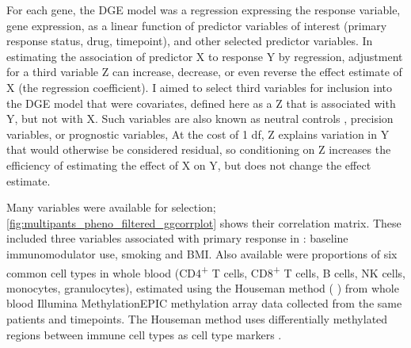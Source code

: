 For each gene, the \gls{DGE} model was a regression expressing the response variable, gene expression, 
as a linear function of predictor variables of interest (primary response status, drug, timepoint),
and other selected predictor variables.
In estimating the association of predictor X to response Y by regression, 
adjustment for a third variable Z can increase, decrease, or even reverse the effect estimate of X (the regression coefficient).
I aimed to select third variables for inclusion into the \gls{DGE} model that were covariates,
defined here as a Z that is associated with Y, but not with X.
Such variables are also known as neutral controls \autocite{cinelli2020CrashCourseGood}, precision variables, or prognostic variables,
At the cost of 1 \gls{df},
Z explains variation in Y that would otherwise be considered residual,
so conditioning on Z increases the efficiency of estimating the effect of X on Y, but does not change the effect estimate.

Many variables were available for selection;
\cref{fig:multipants_pheno_filtered_ggcorrplot} shows their correlation matrix.
These included three variables associated with primary response in \textcite{kennedy2019PredictorsAntiTNFTreatment}: baseline immunomodulator use, smoking and \gls{BMI}.
Also available were proportions of six common cell types in whole blood 
(CD4\textsuperscript{+} T cells, CD8\textsuperscript{+} T cells, B cells, \gls{NK} cells, monocytes, granulocytes),
estimated using the Houseman method ( \autocite{aryee2014MinfiFlexibleComprehensive})
from whole blood Illumina MethylationEPIC methylation array data collected from the same patients and timepoints.
The Houseman method uses differentially methylated regions between immune cell types as cell type markers \autocite{houseman2012DNAMethylationArrays}.

